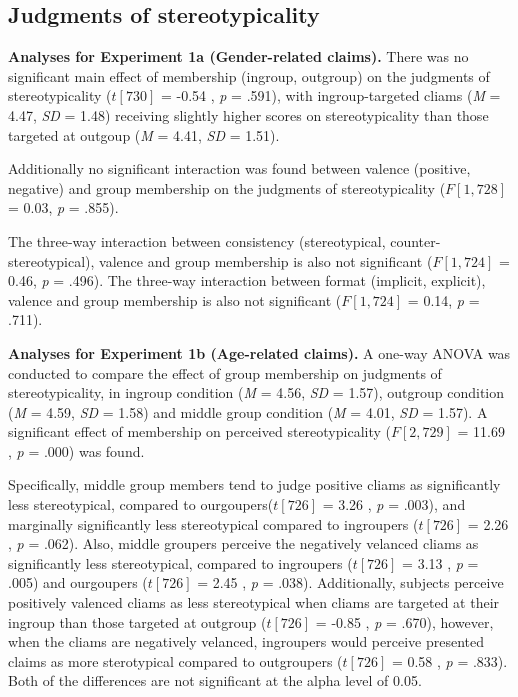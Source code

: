 \documentclass[man]{apa6}
\begin{document}
\subsection{\texorpdfstring{\textbf{Judgments of
stereotypicality}}{Judgments of stereotypicality}}\label{judgments-of-stereotypicality}

\textbf{Analyses for Experiment 1a (Gender-related claims).} There was
no significant main effect of membership (ingroup, outgroup) on the
judgments of stereotypicality (\(t [730]\) = -0.54 , \emph{p} = .591),
with ingroup-targeted cliams (\emph{M} = 4.47, \emph{SD} = 1.48)
receiving slightly higher scores on stereotypicality than those targeted
at outgoup (\emph{M} = 4.41, \emph{SD} = 1.51).

Additionally no significant interaction was found between valence
(positive, negative) and group membership on the judgments of
stereotypicality (\(F [1, 728]\) = 0.03, \emph{p} = .855).

The three-way interaction between consistency (stereotypical,
counter-stereotypical), valence and group membership is also not
significant (\(F [1, 724]\) = 0.46, \emph{p} = .496). The three-way
interaction between format (implicit, explicit), valence and group
membership is also not significant (\(F [1, 724]\) = 0.14, \emph{p} =
.711).

\textbf{Analyses for Experiment 1b (Age-related claims).} A one-way
ANOVA was conducted to compare the effect of group membership on
judgments of stereotypicality, in ingroup condition (\emph{M} = 4.56,
\emph{SD} = 1.57), outgroup condition (\emph{M} = 4.59, \emph{SD} =
1.58) and middle group condition (\emph{M} = 4.01, \emph{SD} = 1.57). A
significant effect of membership on perceived stereotypicality
(\(F [2, 729]\) = 11.69 , \emph{p} = .000) was found.

Specifically, middle group members tend to judge positive cliams as
significantly less stereotypical, compared to ourgoupers(\(t [726]\) =
3.26 , \emph{p} = .003), and marginally significantly less stereotypical
compared to ingroupers (\(t [726]\) = 2.26 , \emph{p} = .062). Also,
middle groupers perceive the negatively velanced cliams as significantly
less stereotypical, compared to ingroupers (\(t [726]\) = 3.13 ,
\emph{p} = .005) and ourgoupers (\(t [726]\) = 2.45 , \emph{p} = .038).
Additionally, subjects perceive positively valenced cliams as less
stereotypical when cliams are targeted at their ingroup than those
targeted at outgroup (\(t [726]\) = -0.85 , \emph{p} = .670), however,
when the cliams are negatively velanced, ingroupers would perceive
presented claims as more sterotypical compared to outgroupers
(\(t [726]\) = 0.58 , \emph{p} = .833). Both of the differences are not
significant at the alpha level of 0.05.
\end{document}
